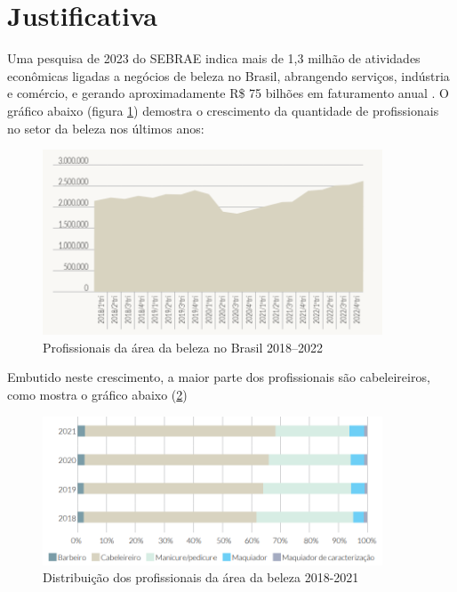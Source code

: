 \section{Justificativa}

Uma pesquisa de 2023 do SEBRAE indica mais de 1,3 milhão de atividades econômicas ligadas a negócios de beleza no Brasil, abrangendo serviços, indústria e comércio, e gerando aproximadamente R\$ 75 bilhões em faturamento anual \cite{sebrae2023forca}. O gráfico abaixo (figura \ref{fig:profissionais_brasil}) demostra o crescimento da quantidade de profissionais no setor da beleza nos últimos anos:

 \begin{figure}[htb]
 	\centering
 	\includegraphics[width=0.9\textwidth]{cap01-Introducao/Images/1.3_grafico_profissionais_brasil}
 	\caption{Profissionais da área da beleza no Brasil 2018–2022}
 	\label{fig:profissionais_brasil}
 \end{figure}
 
 \FloatBarrier
 
Embutido neste crescimento, a maior parte dos profissionais são cabeleireiros, como mostra o gráfico abaixo (\ref{fig:Distribuição_profissionais})

\begin{figure}[htb]
	\centering
	\includegraphics[width=0.9\textwidth]{cap01-Introducao/Images/1.3_grafico_maioria_cabeleireiros}
	\caption{Distribuição dos profissionais da área da beleza 2018-2021}
	\label{fig:Distribuição_profissionais}
\end{figure}

